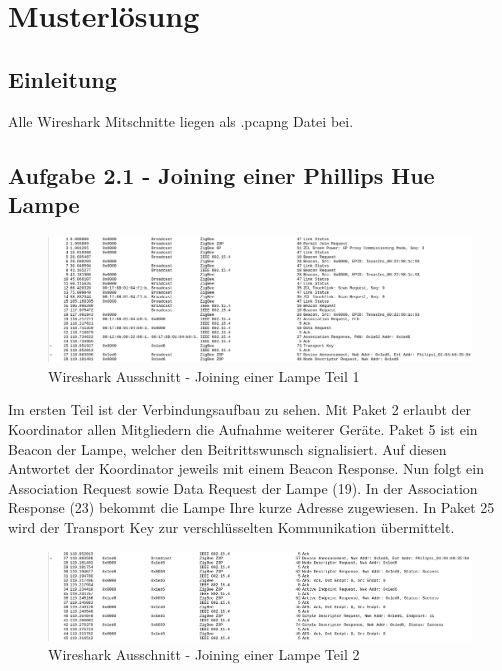 \chapter{Musterlösung}
\section{Einleitung}
Alle Wireshark Mitschnitte liegen als \grqq *.pcapng \grqq{} Datei bei.

\section{Aufgabe 2.1 - Joining einer Phillips Hue Lampe}

\begin{figure}[H]
    \centering
    \includegraphics[width=1\textwidth]{media/lsg2.1-1.png}
    \caption{Wireshark Ausschnitt - Joining einer Lampe Teil 1}
\end{figure}

Im ersten Teil ist der Verbindungsaufbau zu sehen. Mit Paket 2 erlaubt der Koordinator
allen Mitgliedern die Aufnahme weiterer Geräte. Paket 5 ist ein Beacon der Lampe, welcher den Beitrittswunsch
signalisiert. Auf diesen Antwortet der Koordinator jeweils mit einem Beacon Response. Nun folgt ein Association
Request sowie Data Request der Lampe (19). In der Association Response (23) bekommt die Lampe
Ihre kurze Adresse zugewiesen. In Paket 25 wird der Transport Key zur verschlüsselten Kommunikation 
übermittelt.

\begin{figure}[H]
    \centering
    \includegraphics[width=1\textwidth]{media/lsg2.1-2.png}
    \caption{Wireshark Ausschnitt - Joining einer Lampe Teil 2}
\end{figure}

